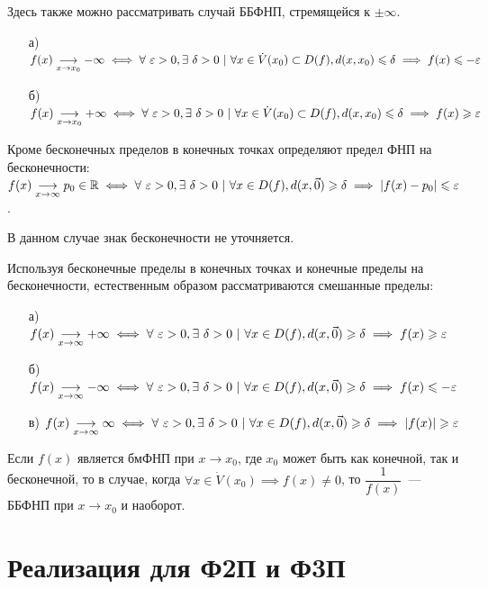 \documentclass[../../main.tex]{subfiles}
\begin{document}
Здесь также можно рассматривать случай ББФНП, стремящейся к $\pm \infty$.
\begin{itemize}
	\item[а)] $f(x)\underset{x \to x_0}{\longrightarrow} -\infty \iff
	\forall\ \varepsilon > 0, \exists\ \delta > 0\ |\
	\forall x \in \dot{V}(x_0) \subset D(f), d(x, x_0) \leqslant \delta
	\implies f(x) \leqslant -\varepsilon$
	\item[б)] $f(x)\underset{x \to x_0}{\longrightarrow} +\infty \iff
	\forall\ \varepsilon > 0, \exists\ \delta > 0\ |\
	\forall x \in \dot{V}(x_0) \subset D(f), d(x, x_0) \leqslant \delta
	\implies f(x) \geqslant \varepsilon$
\end{itemize}

Кроме бесконечных пределов в конечных точках определяют предел ФНП
на бесконечности: $f(x)\underset{x \to \infty}{\longrightarrow}
p_0 \in \mathbb{R} \iff
\forall\ \varepsilon > 0, \exists\ \delta > 0\ |\
\forall x \in D(f), d(x, \vec{0}) \geqslant \delta
\implies |f(x) - p_0| \leqslant \varepsilon$.

В данном случае знак бесконечности не уточняется.

Используя бесконечные пределы в конечных точках и 
конечные пределы на бесконечности,
естественным образом рассматриваются смешанные пределы:

\begin{itemize}
	\item[а)] $f(x)\underset{x \to \infty}{\longrightarrow} +\infty \iff
	\forall\ \varepsilon > 0, \exists\ \delta > 0\ |\
	\forall x \in D(f), d(x, \vec{0}) \geqslant \delta
	\implies f(x) \geqslant \varepsilon$
	\item[б)] $f(x)\underset{x \to \infty}{\longrightarrow} -\infty \iff
	\forall\ \varepsilon > 0, \exists\ \delta > 0\ |\
	\forall x \in D(f), d(x, \vec{0}) \geqslant \delta
	\implies f(x) \leqslant -\varepsilon$
	\item[в)] $f(x)\underset{x \to \infty}{\longrightarrow} \infty \iff
	\forall\ \varepsilon > 0, \exists\ \delta > 0\ |\
	\forall x \in D(f), d(x, \vec{0}) \geqslant \delta
	\implies |f(x)| \geqslant \varepsilon$
\end{itemize}
	
Если $f(x)$ является бмФНП при $x \to x_0$, где $x_0$ может быть как конечной,
так и бесконечной, то в случае, когда $\forall x \in \dot{V}{(x_0)} \implies
f(x) \ne 0$, то $\dfrac{1}{f(x)}$~--- ББФНП при $x \to x_0$ и наоборот.
	
\section{Реализация для Ф2П и Ф3П}	
\end{document}
